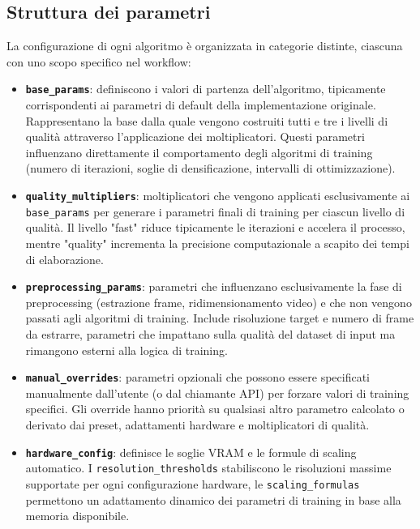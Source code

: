 \subsection{Struttura dei parametri}

La configurazione di ogni algoritmo è organizzata in categorie distinte, ciascuna con uno scopo specifico nel workflow:

\begin{itemize}
\item \textbf{\texttt{base\_params}}: definiscono i valori di partenza dell'algoritmo, tipicamente corrispondenti ai parametri di default della implementazione originale. Rappresentano la base dalla quale vengono costruiti tutti e tre i livelli di qualità attraverso l'applicazione dei moltiplicatori. Questi parametri influenzano direttamente il comportamento degli algoritmi di training (numero di iterazioni, soglie di densificazione, intervalli di ottimizzazione).

\item \textbf{\texttt{quality\_multipliers}}: moltiplicatori che vengono applicati esclusivamente ai \texttt{base\allowbreak\_params} per generare i parametri finali di training per ciascun livello di qualità. Il livello "fast" riduce tipicamente le iterazioni e accelera il processo, mentre "quality" incrementa la precisione computazionale a scapito dei tempi di elaborazione.

\item \textbf{\texttt{preprocessing\_params}}: parametri che influenzano esclusivamente la fase di preprocessing (estrazione frame, ridimensionamento video) e che non vengono passati agli algoritmi di training. Include risoluzione target e numero di frame da estrarre, parametri che impattano sulla qualità del dataset di input ma rimangono esterni alla logica di training.

\item \textbf{\texttt{manual\_overrides}}: parametri opzionali che possono essere specificati manualmente dall’utente (o dal chiamante API) per forzare valori di training specifici. Gli override hanno priorità su qualsiasi altro parametro calcolato o derivato dai preset, adattamenti hardware e moltiplicatori di qualità. 

\item \textbf{\texttt{hardware\_config}}: definisce le soglie VRAM e le formule di scaling automatico. I \texttt{resolution\_thresholds} stabiliscono le risoluzioni massime supportate per ogni configurazione hardware, le \texttt{scaling\_formulas} permettono un adattamento dinamico dei parametri di training in base alla memoria disponibile.
\end{itemize}


